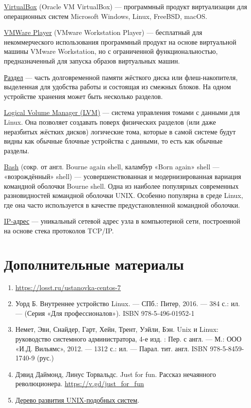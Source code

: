 \documentclass[14pt, a4paper]{article}
\begin{document}
\href{https://www.virtualbox.org/}{VirtualBox} (Oracle VM VirtualBox) — программный продукт виртуализации для операционных систем
Microsoft Windows, Linux, FreeBSD, macOS.

\href{https://www.vmware.com/ru/products/workstation-player.html}{VMWare Player} (VMware Workstation Player) — бесплатный для некоммерческого использования
программный продукт на основе виртуальной машины VMware Workstation, но с ограниченной
функциональностью, предназначенный для запуска образов виртуальных машин.

\href{https://help.ubuntu.ru/wiki/ðàçäåëû_è_ôàéëîâûå_ñèñòåìû_linux}{Раздел} — часть долговременной памяти жёсткого диска или флеш-накопителя, выделенная для
удобства работы и состоящая из смежных блоков. На одном устройстве хранения может быть
несколько разделов.

\href{https://help.ubuntu.ru/wiki/lvm}{Logical Volume Manager (LVM)} — система управления томами с данными для Linux. Она позволяет
создавать поверх физических разделов (или даже неразбитых жёстких дисков) логические тома,
которые в самой системе будут видны как обычные блочные устройства с данными, то есть как
обычные разделы.

\href{https://ru.wikipedia.org/wiki/Bash}{Bash} (сокр. от англ. Bourne again shell, каламбур «Born again» shell — «возрождённый» shell) —
усовершенствованная и модернизированная вариация командной оболочки Bourne shell. Одна из
наиболее популярных современных разновидностей командной оболочки UNIX. Особенно популярна
в среде Linux, где она часто используется в качестве предустановленной командной оболочки.

\href{https://ru.wikipedia.org/wiki/IP-%D0%B0%D0%B4%D1%80%D0%B5%D1%81}{IP-адрес} — уникальный сетевой адрес узла в компьютерной сети, построенной на основе стека
протоколов TCP/IP.

\section*{Дополнительные материалы}
\begin{enumerate}
    \item \href{https://losst.ru/ustanovka-centos-7}{https://losst.ru/ustanovka-centos-7}
    \item Уорд Б. Внутреннее устройство Linux. — СПб.: Питер, 2016. — 384 с.: ил. — (Серия «Для
    профессионалов»). ISBN 978-5-496-01952-1
    \item Немет, Эви, Снайдер, Гарт, Хейн, Трент, Уэйли, Бэн. Unix и Linux: руководство системного
    администратора, 4-е изд. : Пер. с англ. — М.: ООО «И.Д. Вильямс», 2012. — 1312 с.: ил. —
    Парал. тит. англ. ISBN 978-5-8459-1740-9 (рус.)
    \item Дэвид Даймонд, Линус Торвальдс. Just for fun. Рассказ нечаянного революционера.
    \href{https://v.gd/just_for_fun}{https://v.gd/just\_for\_fun}
    \item \href{https://upload.wikimedia.org/wikipedia/commons/7/77/Unix_history-simple.svg}{Дерево развития UNIX-подобных систем}.
\end{enumerate}
\end{document}
